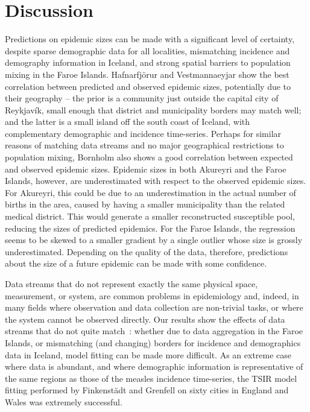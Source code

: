 \documentclass[10pt]{article}
\begin{document}
\section*{Discussion}

Predictions on epidemic sizes can be made with a significant level of certainty, despite sparse demographic data for all localities, mismatching incidence and demography information in Iceland, and strong spatial barriers to population mixing in the Faroe Islands. Hafnarfj\"{o}r\dh{}ur and Vestmannaeyjar show the best correlation between predicted and observed epidemic sizes, potentially due to their geography -- the prior is a community just outside the capital city of Reykjav\'{i}k, small enough that district and municipality borders may match well; and the latter is a small island off the south coast of Iceland, with complementary demographic and incidence time-series. Perhaps for similar reasons of matching data streams and no major geographical restrictions to population mixing, Bornholm also shows a good correlation between expected and observed epidemic sizes. Epidemic sizes in both Akureyri and the Faroe Islands, however, are underestimated with respect to the observed epidemic sizes. For Akureyri, this could be due to an underestimation in the actual number of births in the area, caused by having a smaller municipality than the related medical district. This would generate a smaller reconstructed susceptible pool, reducing the sizes of predicted epidemics. For the Faroe Islands, the regression seems to be skewed to a smaller gradient by a single outlier whose size is grossly underestimated. Depending on the quality of the data, therefore, predictions about the size of a future epidemic can be made with some confidence. 

Data streams that do not represent exactly the same physical space, measurement, or system, are common problems in epidemiology and, indeed, in many fields where observation and data collection are non-trivial tasks, or where the system cannot be observed directly. Our results show the effects of data streams that do not quite match~: whether due to data aggregation in the Faroe Islands, or mismatching (and changing) borders for incidence and demographics data in Iceland, model fitting can be made more difficult. As an extreme case where data is abundant, and where demographic information is representative of the same regions as those of the measles incidence time-series, the TSIR model fitting performed by Finkenst\"{a}dt and Grenfell \cite{Finkenstadt2000} on sixty cities in England and Wales was extremely successful.
\end{document}
